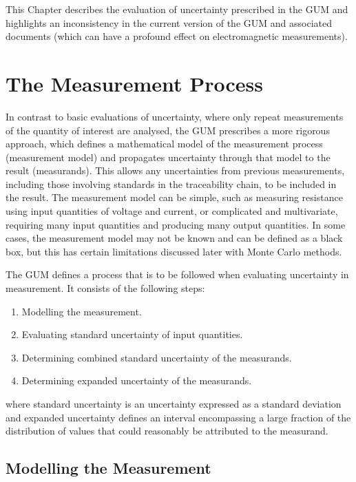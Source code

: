 \documentclass[../thesis.tex]{subfiles}
\begin{document}
\begin{refsection}
This Chapter describes the evaluation of uncertainty prescribed in the GUM and highlights an inconsistency in the current version of the GUM and associated documents (which can have a profound effect on electromagnetic measurements).

\section{The Measurement Process}

In contrast to basic evaluations of uncertainty, where only repeat measurements of the quantity of interest are analysed, the GUM prescribes a more rigorous approach, which defines a mathematical model of the measurement process (measurement model) and propagates uncertainty through that model to the result (measurands). This allows any uncertainties from previous measurements, including those involving standards in the traceability chain, to be included in the result. The measurement model can be simple, such as measuring resistance using input quantities of voltage and current, or complicated and multivariate, requiring many input quantities and producing many output quantities. In some cases, the measurement model may not be known and can be defined as a black box, but this has certain limitations discussed later with Monte Carlo methods.

The GUM defines a process that is to be followed when evaluating uncertainty in measurement. It consists of the following steps:

\begin{enumerate}
	\item Modelling the measurement.
	\item Evaluating standard uncertainty of input quantities.
	\item Determining combined standard uncertainty of the measurands.
	\item Determining expanded uncertainty of the measurands.
\end{enumerate}

where standard uncertainty is an uncertainty expressed as a standard deviation and expanded uncertainty defines an interval encompassing a large fraction of the distribution of values that could reasonably be attributed to the measurand.

\subsection{Modelling the Measurement}


\end{refsection}
\end{document}

